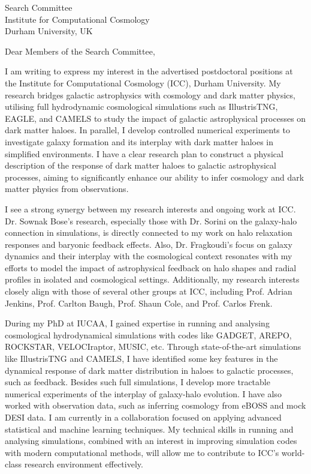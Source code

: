 \documentclass[10pt]{letter}
\date{December 16, 2024}
\begin{document}
\begin{letter}{Search Committee \\ Institute for Computational Cosmology \\ Durham University, UK}

\opening{Dear Members of the Search Committee,}
    
I am writing to express my interest in the advertised postdoctoral positions at the Institute for Computational Cosmology (ICC), Durham University. My research bridges galactic astrophysics with cosmology and dark matter physics, utilising full hydrodynamic cosmological simulations such as IllustrisTNG, EAGLE, and CAMELS to study the impact of galactic astrophysical processes on dark matter haloes. In parallel, I develop controlled numerical experiments to investigate galaxy formation and its interplay with dark matter haloes in simplified environments. I have a clear research plan to construct a physical description of the response of dark matter haloes to galactic astrophysical processes, aiming to significantly enhance our ability to infer cosmology and dark matter physics from observations.
    
I see a strong synergy between my research interests and ongoing work at ICC. Dr. Sownak Bose’s research, especially those with Dr. Sorini on the galaxy-halo connection in simulations, is directly connected to my work on halo relaxation responses and baryonic feedback effects. Also, Dr. Fragkoudi’s focus on galaxy dynamics and their interplay with the cosmological context resonates with my efforts to model the impact of astrophysical feedback on halo shapes and radial profiles in isolated and cosmological settings. Additionally, my research interests closely align with those of several other groups at ICC, including Prof. Adrian Jenkins, Prof. Carlton Baugh, Prof. Shaun Cole, and Prof. Carlos Frenk.
    
During my PhD at IUCAA, I gained expertise in running and analysing cosmological hydrodynamical simulations with codes like GADGET, AREPO, ROCKSTAR, VELOCIraptor, MUSIC, etc. Through state-of-the-art simulations like IllustrisTNG and CAMELS, I have identified some key features in the dynamical response of dark matter distribution in haloes to galactic processes, such as feedback. Besides such full simulations, I develop more tractable numerical experiments of the interplay of galaxy-halo evolution. I have also worked with observation data, such as inferring cosmology from eBOSS and mock DESI data. I am currently in a collaboration focused on applying advanced statistical and machine learning techniques. My technical skills in running and analysing simulations, combined with an interest in improving simulation codes with modern computational methods, will allow me to contribute to ICC’s world-class research environment effectively.
    

\end{letter}
\end{document}
